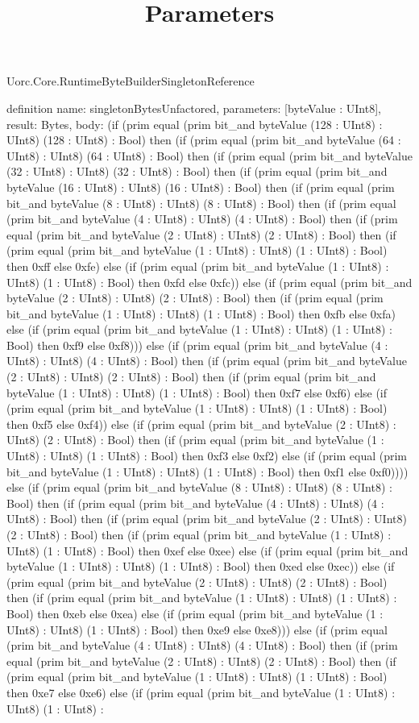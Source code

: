 \begin{lexlean}{Uorc.Core.RuntimeByteBuilderSingletonReference}
\title{Parameters}
\begin{semanticmodule}
definition{
  name: singletonBytesUnfactored,
  parameters: [byteValue : UInt8],
  result: Bytes,
  body: (if (prim equal (prim bit_and byteValue (128 : UInt8) : UInt8) (128 : UInt8) : Bool) then (if (prim equal (prim bit_and byteValue (64 : UInt8) : UInt8) (64 : UInt8) : Bool) then (if (prim equal (prim bit_and byteValue (32 : UInt8) : UInt8) (32 : UInt8) : Bool) then (if (prim equal (prim bit_and byteValue (16 : UInt8) : UInt8) (16 : UInt8) : Bool) then (if (prim equal (prim bit_and byteValue (8 : UInt8) : UInt8) (8 : UInt8) : Bool) then (if (prim equal (prim bit_and byteValue (4 : UInt8) : UInt8) (4 : UInt8) : Bool) then (if (prim equal (prim bit_and byteValue (2 : UInt8) : UInt8) (2 : UInt8) : Bool) then (if (prim equal (prim bit_and byteValue (1 : UInt8) : UInt8) (1 : UInt8) : Bool) then 0xff else 0xfe) else (if (prim equal (prim bit_and byteValue (1 : UInt8) : UInt8) (1 : UInt8) : Bool) then 0xfd else 0xfc)) else (if (prim equal (prim bit_and byteValue (2 : UInt8) : UInt8) (2 : UInt8) : Bool) then (if (prim equal (prim bit_and byteValue (1 : UInt8) : UInt8) (1 : UInt8) : Bool) then 0xfb else 0xfa) else (if (prim equal (prim bit_and byteValue (1 : UInt8) : UInt8) (1 : UInt8) : Bool) then 0xf9 else 0xf8))) else (if (prim equal (prim bit_and byteValue (4 : UInt8) : UInt8) (4 : UInt8) : Bool) then (if (prim equal (prim bit_and byteValue (2 : UInt8) : UInt8) (2 : UInt8) : Bool) then (if (prim equal (prim bit_and byteValue (1 : UInt8) : UInt8) (1 : UInt8) : Bool) then 0xf7 else 0xf6) else (if (prim equal (prim bit_and byteValue (1 : UInt8) : UInt8) (1 : UInt8) : Bool) then 0xf5 else 0xf4)) else (if (prim equal (prim bit_and byteValue (2 : UInt8) : UInt8) (2 : UInt8) : Bool) then (if (prim equal (prim bit_and byteValue (1 : UInt8) : UInt8) (1 : UInt8) : Bool) then 0xf3 else 0xf2) else (if (prim equal (prim bit_and byteValue (1 : UInt8) : UInt8) (1 : UInt8) : Bool) then 0xf1 else 0xf0)))) else (if (prim equal (prim bit_and byteValue (8 : UInt8) : UInt8) (8 : UInt8) : Bool) then (if (prim equal (prim bit_and byteValue (4 : UInt8) : UInt8) (4 : UInt8) : Bool) then (if (prim equal (prim bit_and byteValue (2 : UInt8) : UInt8) (2 : UInt8) : Bool) then (if (prim equal (prim bit_and byteValue (1 : UInt8) : UInt8) (1 : UInt8) : Bool) then 0xef else 0xee) else (if (prim equal (prim bit_and byteValue (1 : UInt8) : UInt8) (1 : UInt8) : Bool) then 0xed else 0xec)) else (if (prim equal (prim bit_and byteValue (2 : UInt8) : UInt8) (2 : UInt8) : Bool) then (if (prim equal (prim bit_and byteValue (1 : UInt8) : UInt8) (1 : UInt8) : Bool) then 0xeb else 0xea) else (if (prim equal (prim bit_and byteValue (1 : UInt8) : UInt8) (1 : UInt8) : Bool) then 0xe9 else 0xe8))) else (if (prim equal (prim bit_and byteValue (4 : UInt8) : UInt8) (4 : UInt8) : Bool) then (if (prim equal (prim bit_and byteValue (2 : UInt8) : UInt8) (2 : UInt8) : Bool) then (if (prim equal (prim bit_and byteValue (1 : UInt8) : UInt8) (1 : UInt8) : Bool) then 0xe7 else 0xe6) else (if (prim equal (prim bit_and byteValue (1 : UInt8) : UInt8) (1 : UInt8) : }
\end{semanticmodule}
\end{lexlean}

